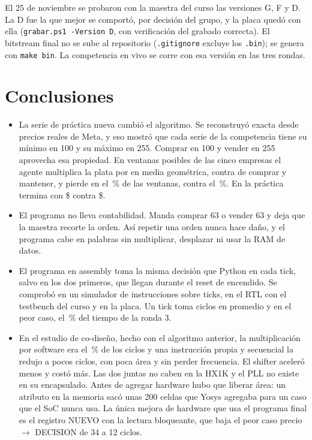 \documentclass[11pt,letterpaper]{article}
\begin{document}
El 25 de noviembre se probaron con la maestra del curso las versiones G, F y D. La D fue la que mejor
se comportó, por decisión del grupo, y la placa quedó con ella (\texttt{grabar.ps1 -Version D}, con
verificación del grabado correcta). El bitstream final no se sube al repositorio (\texttt{.gitignore} excluye los \texttt{.bin}); se genera
con \texttt{make bin}. La competencia en vivo se corre con esa versión en las tres rondas.

\section{Conclusiones}

\begin{itemize}
\item La serie de práctica nueva cambió el algoritmo. Se reconstruyó exacta desde precios reales de Meta, y
eso mostró que cada serie de la competencia tiene su mínimo en 100 y su máximo en 255. Comprar en 100
y vender en 255 aprovecha esa propiedad. En \NVentanas{} ventanas posibles de las cinco empresas el
agente multiplica la plata por \ExtGeo{} en media geométrica, contra \CymGeo{} de comprar y mantener,
y pierde en el \ExtPierde\,\% de las ventanas, contra el \CymPierde\,\%. En la práctica termina con
\$\MetaW{} contra \$\MetaCym.

\item El programa no lleva contabilidad. Manda comprar 63 o vender 63 y deja que la maestra recorte la
orden. Así repetir una orden nunca hace daño, y el programa cabe en \ExtPalabras{} palabras sin multiplicar,
desplazar ni usar la RAM de datos.

\item El programa en assembly toma la misma decisión que Python en cada tick, salvo en los dos primeros, que llegan durante el reset de encendido. Se comprobó en un simulador
de instrucciones sobre \ExtNTicks{} ticks, en el RTL con el testbench del curso y en la placa. Un tick toma
\ExtCiclosProm{} ciclos en promedio y \ExtCiclosPeor{} en el peor caso, el \ExtPctRtres\,\% del tiempo de la
ronda 3.

\item En el estudio de co-diseño, hecho con el algoritmo anterior, la multiplicación por software era el
\FracMul\,\% de los ciclos y una instrucción propia y secuencial la redujo a pocos ciclos, con poca
área y sin perder frecuencia. El shifter aceleró menos y costó más. Las dos juntas no caben en la HX1K
y el PLL no existe en su encapsulado. Antes de agregar hardware hubo que liberar área: un atributo en
la memoria sacó unas 200 celdas que Yosys agregaba para un caso que el SoC nunca usa. La única mejora de
hardware que usa el programa final es el registro NUEVO con la lectura bloqueante, que baja el peor caso
precio $\to$ DECISION de 34 a 12 ciclos.


\end{itemize}
\end{document}
